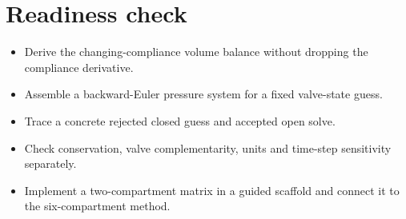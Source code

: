 \documentclass[11pt,letterpaper]{article}
\theoremstyle{definition}\newtheorem{definition}{Definition}\newtheorem{example}{Example}
\numberwithin{equation}{section}
\begin{document}
\section*{Readiness check}
\begin{itemize}
\item Derive the changing-compliance volume balance without dropping the compliance derivative.
\item Assemble a backward-Euler pressure system for a fixed valve-state guess.
\item Trace a concrete rejected closed guess and accepted open solve.
\item Check conservation, valve complementarity, units and time-step sensitivity separately.
\item Implement a two-compartment matrix in a guided scaffold and connect it to the six-compartment method.
\end{itemize}
\end{document}

